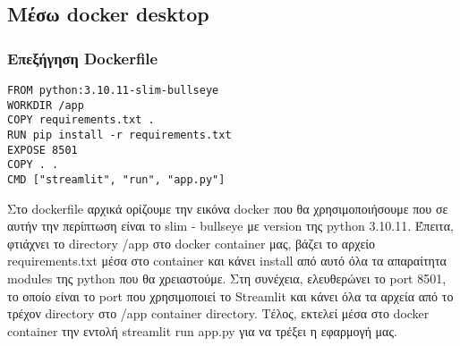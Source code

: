 \documentclass[a4paper,12pt]{article}
\begin{document}
\subsection{Μέσω  docker desktop}
\subsubsection{Eπεξήγηση Dockerfile}
\begin{lstlisting}
FROM python:3.10.11-slim-bullseye
WORKDIR /app
COPY requirements.txt .
RUN pip install -r requirements.txt
EXPOSE 8501
COPY . .
CMD ["streamlit", "run", "app.py"]
\end{lstlisting}
Στο dockerfile αρχικά ορίζουμε την εικόνα docker που θα χρησιμοποιήσουμε που σε αυτήν την περίπτωση είναι το slim - bullseye με version της python 3.10.11. Έπειτα, φτιάχνει το directory /app στο docker container μας, βάζει το αρχείο requirements.txt μέσα στο container και κάνει install από αυτό όλα τα απαραίτητα modules της python που θα χρειαστούμε. Στη συνέχεια, ελευθερώνει το port 8501, το οποίο είναι το port που χρησιμοποιεί το Streamlit και κάνει όλα τα αρχεία από το τρέχον directory στο /app container directory. Τέλος, εκτελεί μέσα στο docker container την εντολή streamlit run app.py για να τρέξει η εφαρμογή μας. 
\end{document}
